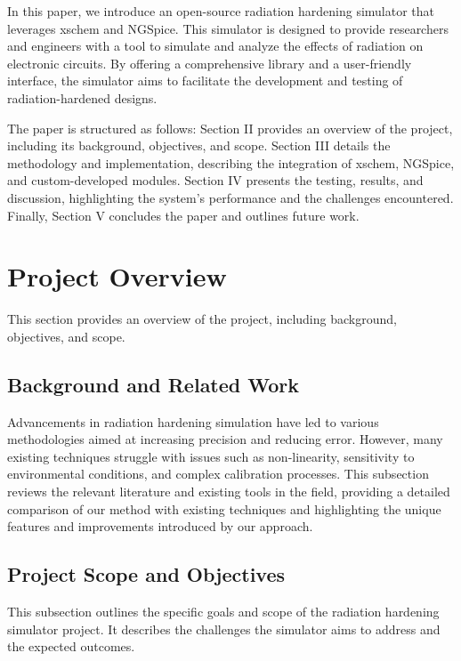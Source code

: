 \documentclass[conference]{IEEEtran}
\begin{document}
In this paper, we introduce an open-source radiation hardening simulator that leverages xschem and NGSpice. This simulator is designed to provide researchers and engineers with a tool to simulate and analyze the effects of radiation on electronic circuits. By offering a comprehensive library and a user-friendly interface, the simulator aims to facilitate the development and testing of radiation-hardened designs.

The paper is structured as follows: Section II provides an overview of the project, including its background, objectives, and scope. Section III details the methodology and implementation, describing the integration of xschem, NGSpice, and custom-developed modules. Section IV presents the testing, results, and discussion, highlighting the system's performance and the challenges encountered. Finally, Section V concludes the paper and outlines future work.

\section{Project Overview}
This section provides an overview of the project, including background, objectives, and scope.

\subsection{Background and Related Work}
Advancements in radiation hardening simulation have led to various methodologies aimed at increasing precision and reducing error. However, many existing techniques struggle with issues such as non-linearity, sensitivity to environmental conditions, and complex calibration processes. This subsection reviews the relevant literature and existing tools in the field, providing a detailed comparison of our method with existing techniques and highlighting the unique features and improvements introduced by our approach.

\subsection{Project Scope and Objectives}
This subsection outlines the specific goals and scope of the radiation hardening simulator project. It describes the challenges the simulator aims to address and the expected outcomes.
\end{document}
